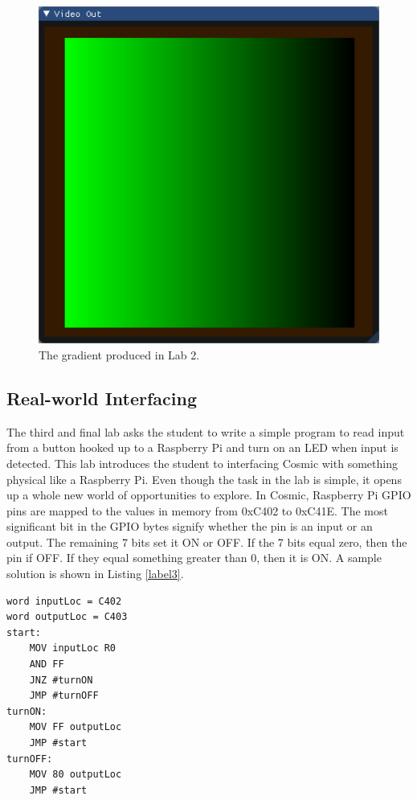 \documentclass[conference]{IEEEtran}
\begin{document}
\begin{figure}[h!]
	\includegraphics[width=\linewidth]{lab_2_solution}
	\caption{The gradient produced in Lab 2.}
	\label{fig:gradient}
\end{figure}

\subsection{Real-world Interfacing}
The third and final lab asks the student to write a simple program to read input from a button hooked up to a Raspberry Pi and turn on an LED when input is detected. This lab introduces the student to interfacing Cosmic with something physical like a Raspberry Pi. Even though the task in the lab is simple, it opens up a whole new world of opportunities to explore. In Cosmic, Raspberry Pi GPIO pins are mapped to the values in memory from 0xC402 to 0xC41E. The most significant bit in the GPIO bytes signify whether the pin is an input or an output. The remaining 7 bits set it ON or OFF. If the 7 bits equal zero, then the pin if OFF. If they equal something greater than 0, then it is ON. A sample solution is shown in Listing \ref{label3}.

\begin{lstlisting}[caption={Cosmic assembly to interface with a Raspberry Pi.}, label = {label3}]
word inputLoc = C402
word outputLoc = C403
start:
	MOV inputLoc R0
    AND FF
	JNZ #turnON
    JMP #turnOFF
turnON:
	MOV FF outputLoc
    JMP #start
turnOFF:
	MOV 80 outputLoc
	JMP #start
\end{lstlisting}
\end{document}
